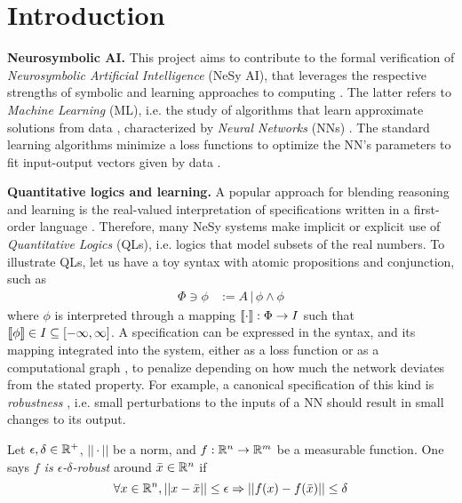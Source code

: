 \section{Introduction} \label{Introduction}

\textbf{Neurosymbolic AI.} This project aims to contribute to the formal verification of \textit{Neurosymbolic Artificial Intelligence} (NeSy AI), that leverages the respective strengths of symbolic and learning approaches to computing \citep{ d2009neural, medsker2012hybrid, platzer2024intersymbolic}. The latter refers to \textit{Machine Learning} (ML), i.e. the study of  algorithms that learn approximate solutions from data \citep{brewka1996artificial}, characterized by \textit{Neural Networks} (NNs) \citep{badreddine2022logic, petersen2022deep}. The standard learning algorithms minimize a loss functions to optimize the NN's parameters to fit input-output vectors given by data \citep{brewka1996artificial}. 

\textbf{Quantitative logics and learning.} A popular approach for blending reasoning and learning is the real-valued interpretation of specifications written in a first-order language \citep{slusarz2023logic,serafini2016logic, petersen2022deep, choi2020probabilistic}. Therefore, many NeSy systems make implicit or explicit use of \textit{Quantitative Logics} (QLs), i.e. logics that model subsets of the real numbers. To illustrate QLs, let us have a toy syntax with atomic propositions and conjunction, such as
\begin{equation}
\begin{split}
    \Phi \ni \phi &:= A \,|\, \phi \land \phi
\end{split}
\end{equation}
where $\phi$ is interpreted through a mapping $\llbracket \cdot \rrbracket : \Phi \rightarrow I$ such that $ \llbracket \phi \rrbracket \in I \subseteq [-\infty,\infty]$. A specification can be expressed in the syntax, and its mapping integrated into the system, either as a loss function \citep{slusarz2023logic,van2022analyzing} or as a computational graph \cite{serafini2016logic, petersen2022deep, choi2020probabilistic}, to penalize depending on how much the network deviates from the stated property. For example, a canonical specification of this kind is  \textit{robustness} \citep{casadio2022neural},  i.e. small perturbations to the inputs of a NN should result in small changes to its output.
\begin{definition} %
\label{Robustness}%
    Let $\epsilon, \delta \in \mathbb{R}^+$, $||\cdot||$ be a norm, and $f : \mathbb{R}^n \rightarrow \mathbb{R}^m$ be a measurable function.
    One says \textit{$f$ is $\epsilon$-$\delta$-robust} around $\bar x \in \mathbb{R} ^ n$ if 
    \begin{equation}
    \label{eq:robustness}
        \forall x\in \mathbb{R}^n , ||x - \bar x|| \leq \epsilon \Rightarrow || 
			f(x) - f(\bar x)|| \leq \delta  
    \end{equation}
\end{definition}


